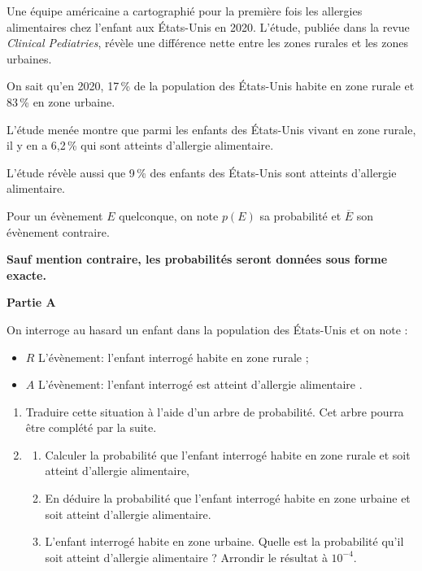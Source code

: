 \medskip

Une équipe américaine a cartographié pour la première fois les allergies alimentaires chez l'enfant aux États-Unis en 2020. L'étude, publiée dans la revue \emph{Clinical Pediatries}, révèle une différence nette entre les zones rurales et les zones urbaines.

\smallskip

On sait qu'en 2020, 17\,\% de la population des États-Unis habite en zone rurale et 83\,\% en zone urbaine.

\smallskip

L'étude menée montre que parmi les enfants des États-Unis vivant en zone rurale, il y en a 6,2\,\% qui sont atteints d'allergie alimentaire.

L'étude révèle aussi que 9\,\% des enfants des États-Unis sont atteints d'allergie alimentaire. 

\smallskip

Pour un évènement $E$ quelconque, on note $p(E)$ sa probabilité et $\overline{E}$ son évènement contraire.

\textbf{Sauf mention contraire, les probabilités seront données sous forme exacte.}

\medskip

\textbf{Partie A}

\medskip

On interroge au hasard un enfant dans la population des États-Unis et on note :

\begin{itemize}[label=$\bullet~$]
\item $R$ L'évènement: \og l'enfant interrogé habite en zone rurale \fg ;
\item $A$ L'évènement: \og l'enfant interrogé est atteint d'allergie alimentaire \fg.
\end{itemize}

\medskip

\begin{enumerate}
\item Traduire cette situation à l'aide d'un arbre de probabilité. Cet arbre pourra être complété par la suite.
\item 
	\begin{enumerate}
		\item Calculer la probabilité que l'enfant interrogé habite en zone rurale et soit atteint d'allergie alimentaire,
		\item En déduire la probabilité que l'enfant interrogé habite en zone urbaine et soit atteint d'allergie alimentaire.
		\item L'enfant interrogé habite en zone urbaine. Quelle est la probabilité qu'il soit atteint d'allergie alimentaire ? Arrondir le résultat à $10^{-4}$.
	\end{enumerate}
\end{enumerate}

